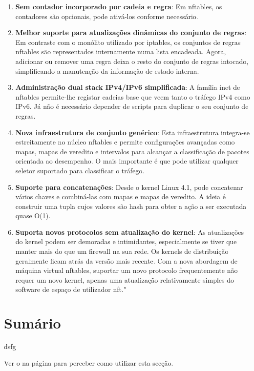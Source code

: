 \begin{enumerate}
\item \textbf{Sem contador incorporado por cadeia e regra}: Em nftables, os contadores 
são opcionais, pode ativá-los conforme necessário.

\item \textbf{Melhor suporte para atualizações dinâmicas do conjunto de regras}: Em 
contraste com o monólito utilizado por iptables, os conjuntos de regras nftables são 
representados internamente numa lista encadeada. Agora, adicionar ou remover uma regra 
deixa o resto do conjunto de regras intocado, simplificando a manutenção da informação 
de estado interna.

\item \textbf{Administração dual stack IPv4/IPv6 simplificada}: A família inet de 
nftables permite-lhe registar cadeias base que veem tanto o tráfego IPv4 como IPv6. 
Já não é necessário depender de scripts para duplicar o seu conjunto de regras.

\item \textbf{Nova infraestrutura de conjunto genérico}: Esta infraestrutura integra-se 
estreitamente no núcleo nftables e permite configurações avançadas como mapas, mapas 
de veredito e intervalos para alcançar a classificação de pacotes orientada ao desempenho. O mais importante é que pode utilizar qualquer seletor suportado para classificar o tráfego.

\item \textbf{Suporte para concatenações}: Desde o kernel Linux 4.1, pode concatenar 
vários chaves e combiná-las com mapas e mapas de veredito. A ideia é construir uma tupla 
cujos valores são hash para obter a ação a ser executada quase O(1).

\item \textbf{Suporta novos protocolos sem atualização do kernel}: As atualizações do 
kernel podem ser demoradas e intimidantes, especialmente se tiver que manter mais do 
que um firewall na sua rede. Os kernels de distribuição geralmente ficam atrás da 
versão mais recente. Com a nova abordagem de máquina virtual nftables, suportar 
um novo protocolo frequentemente não requer um novo kernel, apenas uma atualização 
relativamente simples do software de espaço de utilizador nft."
\end{enumerate}


\section*{Sumário}

dsfg

Ver o  na página \pageref{sec:intro_summary} para perceber como utilizar esta secção.
